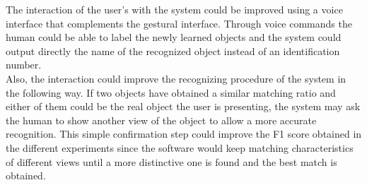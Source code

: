 	The interaction of the user's with the system could be improved using a voice interface that complements the gestural interface. 
	Through voice commands the human could be able to label the newly learned objects and the system could output directly the name of the recognized object instead of an identification number. 
	\\

	Also, the interaction could improve the recognizing procedure of the system in the following way. 
	If two objects have obtained a similar matching ratio and either of them could be the real object the user is presenting, the system may ask the human to show another view of the object to allow a more accurate recognition. 
	This simple confirmation step could improve the F1 score obtained in the different experiments since the software would keep matching characteristics of different views until a more distinctive one is found and the best match is obtained. 
